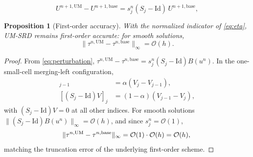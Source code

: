\documentclass[10pt,a4paper]{amsart}
\newtheorem{proposition}{Proposition}
\begin{document}
\begin{equation}
  U^{n+1,\mathrm{UM}} - U^{n+1,\mathrm{base}}
  = s_j^n (S_j - \mathrm{Id})\, U^{n+1,\mathrm{base}},
  \label{eq:perturbation}
\end{equation}

\begin{proposition}[First-order accuracy]
\label{prop:local-consistency}
With the normalized indicator of \eqref{eq:eta}, UM-SRD remains first-order 
accurate: for smooth solutions,
\[
  \|\tau^{n,\mathrm{UM}} - \tau^{n,\mathrm{base}}\|_\infty = \mathcal{O}(h).
\]
\end{proposition}

\begin{proof}
From \eqref{eq:perturbation}, $\tau^{n,\mathrm{UM}} - \tau^{n,\mathrm{base}} 
= s_j^n (S_j - \mathrm{Id}) B(u^n)$. In the one-small-cell merging-left 
configuration,
\begin{align*}
  [(S_j - \mathrm{Id})V]_{j-1} &= \alpha(V_j - V_{j-1}), \\
  [(S_j - \mathrm{Id})V]_j     &= (1-\alpha)(V_{j-1} - V_j),
\end{align*}
with $(S_j - \mathrm{Id})V = 0$ at all other indices. For smooth solutions 
$\|(S_j - \mathrm{Id})B(u^n)\|_\infty = \mathcal{O}(h)$, and since 
$s_j^n = \mathcal{O}(1)$,
\[
  \|\tau^{n,\mathrm{UM}} - \tau^{n,\mathrm{base}}\|_\infty
  = \mathcal{O}(1) \cdot \mathcal{O}(h) = \mathcal{O}(h), \qedhere
\]
matching the truncation error of the underlying first-order scheme.
\end{proof}
\end{document}
